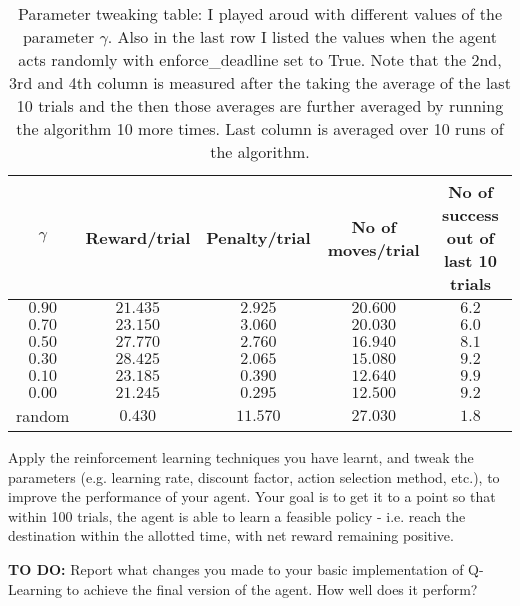 \documentclass{article}
\begin{document}
\begin{table}
  \begin{center}
    \begin{tabular}{ | c || c | c | c | C |}
      \hline
      $\gamma$ & Reward/trial & Penalty/trial & No of moves/trial & No of success out of last 10 trials \\ \hline\hline
      $ 0.90 $ & $21.435$ & $2.925$ & $20.600$ & $6.2$ \\ \hline 
      $ 0.70 $ & $23.150$ & $3.060$ & $20.030$ & $6.0$ \\ \hline 
      $ 0.50 $ & $27.770$ & $2.760$ & $16.940$ & $8.1$ \\ \hline 
      $ 0.30 $ & $28.425$ & $2.065$ & $15.080$ & $9.2$ \\ \hline\hline
      $ 0.10 $ & $23.185$ & $0.390$ & $12.640$ & $9.9$ \\ \hline\hline      
      $ 0.00 $ & $21.245$ & $0.295$ & $12.500$ & $9.2$ \\ \hline\hline\hline
      random   & $0.430$ & $11.570$ & $27.030$ & $1.8$ \\ \hline
    \end{tabular}
   \end{center}
  \caption{Parameter tweaking table: I played aroud with different values of the parameter $\gamma$. Also in the last row I listed the values when the agent acts randomly with enforce\_deadline set to True. Note that the 2nd, 3rd and 4th column is measured after the taking the average of the last 10 trials and the then those averages are further averaged by running the algorithm 10 more times. Last column is averaged over 10 runs of the algorithm. }
\end{table}




Apply the reinforcement learning techniques you have learnt, and tweak the parameters (e.g. learning rate, discount factor, action selection method, etc.), to improve the performance of your agent. Your goal is to get it to a point so that within 100 trials, the agent is able to learn a feasible policy - i.e. reach the destination within the allotted time, with net reward remaining positive.


\vspace{.5cm}

\noindent\textbf{TO DO:} Report what changes you made to your basic implementation of Q-Learning to achieve the final version of the agent. How well does it perform?

\vspace{.2cm}
\end{document}
